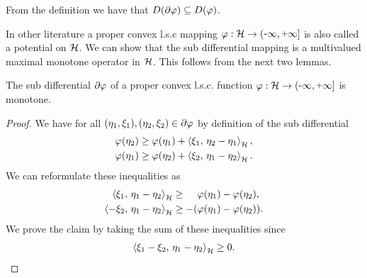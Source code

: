 \begin{remark}
	From the definition we have that $ D(\partial\varphi)\subseteq D(\varphi) $.
\end{remark}

In other literature a proper convex l.s.c mapping
$ \vp:\rH\ra(\minus\infty,\plus\infty] $ is also
called a potential on $ \mathcal{H} $. We can show that the sub 
differential mapping is a multivalued 
maximal monotone operator in $ \mathcal{H} $. This follows from the next two lemmas.

\begin{lemma}\label{lemma:sub diff is mon}
	The sub differential $ \partial \varphi $ of a proper convex l.s.c.
	function $ \varphi:\rH \ra \eRR $ is monotone.
\end{lemma}
\begin{proof}
	We have for all $ (\eta_1,\xi_1), (\eta_2, \xi_2)\in \partial \varphi $
	by definition of the sub differential
	\begin{align*}
		\varphi(\eta_2)&\geq \varphi(\eta_1)+\left\langle \xi_1,\,\eta_2-\eta_1\right\rangle_{\mathcal{H}},\\
		\varphi(\eta_1)&\geq \varphi(\eta_2)+\left\langle \xi_2,\,\eta_1-\eta_2\right\rangle_{\mathcal{H}}.
	\end{align*}
	We can reformulate these inequalities as
	\begin{align*}
		\left\langle \xi_1,\,\eta_1-\eta_2\right\rangle_{\mathcal{H}}&\geq \phantom{-(}\varphi(\eta_1)-\varphi(\eta_2),\\
		\left\langle -\xi_2,\,\eta_1-\eta_2\right\rangle_{\mathcal{H}}&\geq -(\varphi(\eta_1)-\varphi(\eta_2)).
	\end{align*}
	We prove the claim by taking the sum of these inequalities since
	\begin{align*}
		\left\langle \xi_1-\xi_2,\,\eta_1-\eta_2\right\rangle_{\mathcal{H}}\geq 0.
	\end{align*}
\end{proof}

